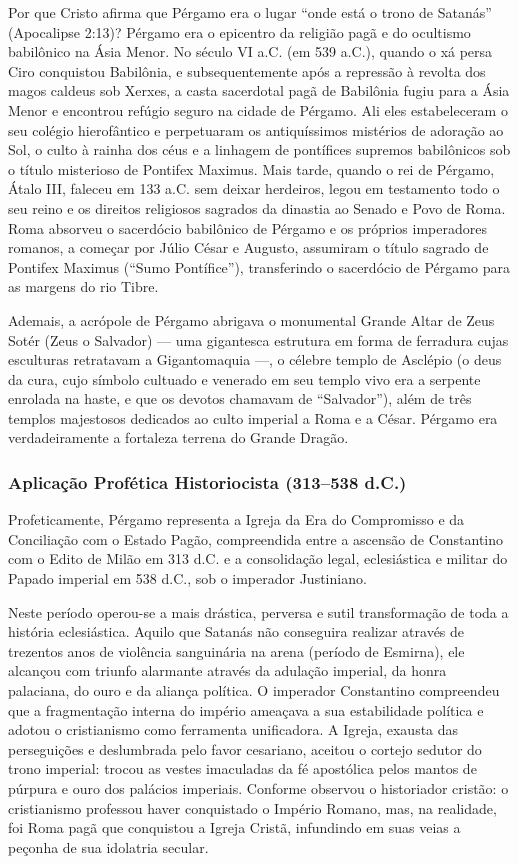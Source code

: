 Por que Cristo afirma que Pérgamo era o lugar ``onde está o trono de Satanás'' (Apocalipse 2:13)? Pérgamo era o epicentro da religião pagã e do ocultismo babilônico na Ásia Menor. No século VI a.C. (em 539 a.C.), quando o xá persa Ciro conquistou Babilônia, e subsequentemente após a repressão à revolta dos magos caldeus sob Xerxes, a casta sacerdotal pagã de Babilônia fugiu para a Ásia Menor e encontrou refúgio seguro na cidade de Pérgamo. Ali eles estabeleceram o seu colégio hierofântico e perpetuaram os antiquíssimos mistérios de adoração ao Sol, o culto à rainha dos céus e a linhagem de pontífices supremos babilônicos sob o título misterioso de Pontifex Maximus. Mais tarde, quando o rei de Pérgamo, Átalo III, faleceu em 133 a.C. sem deixar herdeiros, legou em testamento todo o seu reino e os direitos religiosos sagrados da dinastia ao Senado e Povo de Roma. Roma absorveu o sacerdócio babilônico de Pérgamo e os próprios imperadores romanos, a começar por Júlio César e Augusto, assumiram o título sagrado de Pontifex Maximus (``Sumo Pontífice''), transferindo o sacerdócio de Pérgamo para as margens do rio Tibre.

Ademais, a acrópole de Pérgamo abrigava o monumental Grande Altar de Zeus Sotér (Zeus o Salvador) — uma gigantesca estrutura em forma de ferradura cujas esculturas retratavam a Gigantomaquia —, o célebre templo de Asclépio (o deus da cura, cujo símbolo cultuado e venerado em seu templo vivo era a serpente enrolada na haste, e que os devotos chamavam de ``Salvador''), além de três templos majestosos dedicados ao culto imperial a Roma e a César. Pérgamo era verdadeiramente a fortaleza terrena do Grande Dragão.


\subsubsection*{Aplicação Profética Historiocista (313–538 d.C.)}
Profeticamente, Pérgamo representa a Igreja da Era do Compromisso e da Conciliação com o Estado Pagão, compreendida entre a ascensão de Constantino com o Edito de Milão em 313 d.C. e a consolidação legal, eclesiástica e militar do Papado imperial em 538 d.C., sob o imperador Justiniano.

Neste período operou-se a mais drástica, perversa e sutil transformação de toda a história eclesiástica. Aquilo que Satanás não conseguira realizar através de trezentos anos de violência sanguinária na arena (período de Esmirna), ele alcançou com triunfo alarmante através da adulação imperial, da honra palaciana, do ouro e da aliança política. O imperador Constantino compreendeu que a fragmentação interna do império ameaçava a sua estabilidade política e adotou o cristianismo como ferramenta unificadora. A Igreja, exausta das perseguições e deslumbrada pelo favor cesariano, aceitou o cortejo sedutor do trono imperial: trocou as vestes imaculadas da fé apostólica pelos mantos de púrpura e ouro dos palácios imperiais. Conforme observou o historiador cristão: o cristianismo professou haver conquistado o Império Romano, mas, na realidade, foi Roma pagã que conquistou a Igreja Cristã, infundindo em suas veias a peçonha de sua idolatria secular.


